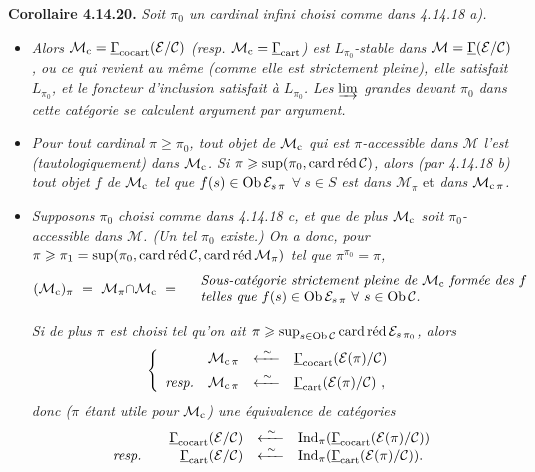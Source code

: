 \textbf{Corollaire 4.14.20.} \textit{Soit $\pi_0$ un cardinal infini choisi comme dans 4.14.18 a).}
\begin{itemize}[leftmargin=2.5em]
\item[\circled{a}] \textit{Alors $\mathcal{M}_{\cc} = \uGamma_{\cocart}(\mathcal{E}/\mathcal{C})$ (resp. $\mathcal{M}_{\cc} = \uGamma_{\cart}$) est $L_{\pi_0}$-stable dans $\mathcal{M} = \uGamma(\mathcal{E}/\mathcal{C})$, ou ce qui revient au même (comme elle est strictement pleine), elle satisfait $L_{\pi_0}$, et le foncteur d’inclusion satisfait à $L_{\pi_0}$. Les $\varinjlim$ grandes devant $\pi_0$ dans cette catégorie se calculent argument par argument.}
\item[\circled{b}] \textit{Pour tout cardinal $\pi \geqslant \pi_0$, tout objet de $\mathcal{M}_{\cc}$ qui est $\pi$-accessible dans $\mathcal{M}$ l’est (tautologiquement) dans $\mathcal{M}_{\cc}$. Si $\pi \geqslant \sup(\pi_0, \cardred\mathcal{C})$, alors (par 4.14.18 b) tout objet $f$ de $\mathcal{M}_{\cc}$ tel que $f(s) \in \Ob\mathcal{E}_{s\,\pi}$ $\forall\ s \in S$} \textit{est dans $\mathcal{M}_\pi$} \textup{et} \textit{dans $\mathcal{M}_{\cc\,\pi}$.}


\item[\circled{c}] \textit{Supposons $\pi_0$ choisi comme dans 4.14.18 c, et que de plus $\mathcal{M}_{\cc}$ soit $\pi_0$-accessible dans $\mathcal{M}$. (Un tel $\pi_0$ existe.) On a donc, pour $\pi \geqslant \pi_1 = \sup(\pi_0, \cardred\mathcal{C}, \cardred\mathcal{M}_\pi)$ tel que $\pi^{\pi_0} = \pi$,}
\[
(\mathcal{M}_{\cc})_\pi \ = \ \mathcal{M}_\pi{\cap}\mathcal{M}_{\cc} \ = \quad
\begin{array}{l}
\textit{Sous-catégorie strictement pleine de $\mathcal{M}_{\cc}$ formée des $f$}\\
\textit{telles que $f(s) \in \Ob\mathcal{E}_{s\,\pi}$ $\forall\ s \in \Ob\mathcal{C}$.}
\end{array}
\]

\textit{Si de plus $\pi$ est choisi tel qu’on ait $\pi \geqslant \sup_{s\in\Ob\mathcal{C}} \cardred\mathcal{E}_{s\,\pi_0}$, alors}
\[
\left\{
\begin{array}{rrcl}
 & \mathcal{M}_{\cc\,\pi} & \xleftarrow{\ \sim\ } & \uGamma_{\cocart}(\mathcal{E}(\pi)/\mathcal{C})\\[1ex]
\textit{resp.} & \mathcal{M}_{\cc\,\pi} & \xleftarrow{\ \sim\ } & \uGamma_{\cart}(\mathcal{E}(\pi)/\mathcal{C}) \ ,
\end{array}
\right.
\]
\textit{donc ($\pi$ étant utile pour $\mathcal{M}_{\cc}$) une équivalence de catégories}
\[
\begin{array}{rrcl}
 & \uGamma_{\cocart}(\mathcal{E}/\mathcal{C}) & \xleftarrow{\ \sim\ } & \mathrm{Ind}_\pi(\uGamma_{\cocart}(\mathcal{E}(\pi)/\mathcal{C}))\\
\textit{resp.}\quad & \uGamma_{\cart}(\mathcal{E}/\mathcal{C}) & \xleftarrow{\ \sim\ } & \mathrm{Ind}_\pi(\uGamma_{\cart}(\mathcal{E}(\pi)/\mathcal{C})).
\end{array}
\]
\end{itemize}

